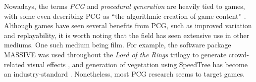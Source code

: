 Nowadays, the terms \textit{PCG} and \textit{procedural generation} are heavily tied to games, with some even describing PCG as ``the algorithmic creation of game content'' \cite[p.1]{pcg_in_games}.
Although games have seen several benefits from PCG, such as improved variation and replayability, it is worth noting that the field has seen extensive use in other mediums.
One such medium being film.
For example, the software package MASSIVE was used throughout the \textit{Lord of the Rings} trilogy to generate crowd-related visual effects \cite{massive}, and generation of vegetation using SpeedTree has become an industry-standard \cite{speedtree_cinema}.
Nonetheless, most PCG research seems to target games.
